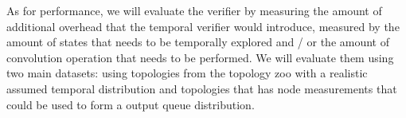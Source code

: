 \documentclass[10pt,sigconf,letterpaper,anonymous,nonacm]{acmart}
\begin{document}
As for performance, we will evaluate the verifier by measuring the amount of additional 
overhead that the temporal verifier would introduce, measured by the amount of states that 
needs to be temporally explored and / or the amount of convolution operation that needs to be 
performed.
We will evaluate them using two main datasets: using topologies from the topology zoo \cite{knight2011internet} with a
realistic assumed temporal distribution and topologies that has node measurements that could 
be used to form a output queue distribution.



\end{document}
